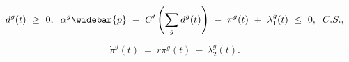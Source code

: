 \begin{equation}
\begin{split}
    d^{g}(t) \ \geq \ 0, \hspace{0.2cm} \alpha^{g} \widebar{p} \ - \ C'\left( \sum_{g} d^{g}(t) \right) \ - \ \pi^{g}(t) \ + \ \lambda_{1}^{g}(t) \ \leq \ 0, \hspace{0.2cm} C.S.,
\end{split}
\label{Equation:AKS-Style-Model_Necessary-Conditions_pi-K}
\end{equation}
\begin{equation}
\begin{split}
    \dot{\pi}^{g}(t) \ = \ r \pi^{g}(t) \ - \ \lambda_{2}^{g}(t).
\end{split}
\label{Equation:AKS-Style-Model_Necessary-Conditions_pi-R}
\end{equation}
